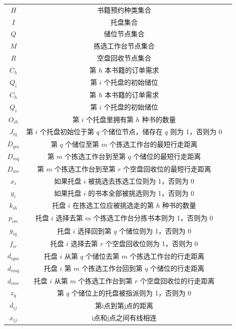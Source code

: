 \documentclass[withoutpreface,bwprint]{thesis-config}
\begin{document}
\begin{table}[H]
	\centering
	\begin{tabular}{c c c}
		\toprule
		\makebox[0.3\textwidth][c]{符号}	&  \makebox[0.4\textwidth][c]{说明} \\ \hline
        $H$ & 书籍预约种类集合\\
        $I$ & 托盘集合 \\
        $Q$ & 储位节点集合 \\
        $M$ & 拣选工作台节点集合 \\
        $R$ & 空盘回收节点集合\\
        $C_h$ & 第 $h$ 本书籍的订单需求\\
        $Q_i$ & 第 $i$ 个托盘的初始储位  \\
        $C_h$ & 第 $h$ 本书籍的订单需求  \\
        $Q_i$ & 第 $i$ 个托盘的初始储位 \\
        $O_{ih}$ & 第 $i$ 个托盘里拥有第 $h$ 种书的数量 \\
        $J_{iq}$ & 第 $i$ 个托盘初始位于第 $q$ 个储位节点，储存在 $q$ 则为 1，否则为 0  \\
        $D_{qm}$ & 第 $q$ 个储位至第 $m$ 个拣选工作台的最短行走距离 \\
        $D_{mq}$ & 第 $m$ 个拣选工作台到至第 $q$ 个储位的最短行走距离 \\
        $D_{mr}$ & 第 $m$ 个拣选工作台到至第 $r$ 个空盘回收位的最短行走距离 \\
        $x_i$ & 如果托盘 $i$ 被挑选去拣选工位则为 1，否则为 0 \\
        $y_i$ & 如果托盘 $i$ 的书本全部被挑选则为 1，否则为 0 \\
        $k_{ih}$ & 托盘 $i$ 在拣选工位应被挑选走的第 $h$ 种书的数量\\
        $p_{im}$ & 托盘 $i$ 选择去第 $m$ 个拣选工作台分拣书本则为 1，否则为 0  \\
        $g_{iq}$ & 托盘 $i$ 选择回到第 $q$ 个储位则为 1，否则为 0 \\
        $f_{ir}$ & 托盘 $i$ 选择去第 $r$ 个空盘回收位则为 1，否则为 0  \\
        $d_{iqm}$ & 托盘 $i$ 从第 $q$ 个储位去第 $m$ 个拣选工作台的行走距离  \\
        $d_{imq}$ & 托盘 $i$ 第 $m$ 个拣选工作台回到第 $q$ 个储位的行走距离 \\
        $d_{imr}$ & 托盘 $i$ 从第 $m$ 个拣选工作台到第 $r$ 个空盘回收位的行走距离& \\
        $z_q$ & 第 $q$ 个储位上的托盘被指派则为 1，否则为 0 \\
        $d_{ij}$ & 第i点到第j点的距离 \\
        $x_{ij}$ & i点和j点之间有线相连 \\
		\bottomrule
	\end{tabular}
\end{table}
\end{document}

